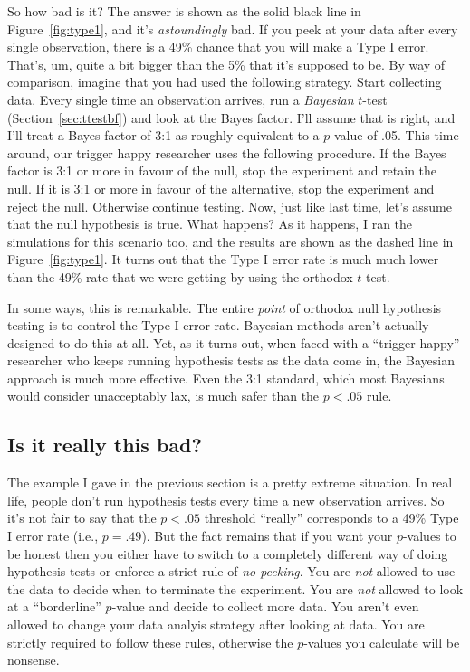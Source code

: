 So how bad is it? The answer is shown as the solid black line in Figure~\ref{fig:type1}, and it's {\it astoundingly} bad. If you peek at your data after every single observation, there is a 49\% chance that you will make a Type I error. That's, um, quite a bit bigger than the 5\% that it's supposed to be. By way of comparison, imagine that you had used the following strategy. Start collecting data. Every single time an observation arrives, run a {\it Bayesian} $t$-test (Section~\ref{sec:ttestbf}) and look at the Bayes factor. I'll assume that \textcite{Johnson2013} is right, and I'll treat a Bayes factor of 3:1 as roughly equivalent to a $p$-value of .05. This time around, our trigger happy researcher uses the following procedure. If the Bayes factor is 3:1 or more in favour of the null, stop the experiment and retain the null. If it is 3:1 or more in favour of the alternative, stop the experiment and reject the null. Otherwise continue testing. Now, just like last time, let's assume that the null hypothesis is true. What happens? As it happens, I ran the simulations for this scenario too, and the results are shown as the dashed line in Figure~\ref{fig:type1}. It turns out that the Type I error rate is much much lower than the 49\% rate that we were getting by using the orthodox $t$-test.

In some ways, this is remarkable. The entire {\it point} of orthodox null hypothesis testing is to control the Type I error rate. Bayesian methods aren't actually designed to do this at all. Yet, as it turns out, when faced with a ``trigger happy'' researcher who keeps running hypothesis tests as the data come in, the Bayesian approach is much more effective. Even the 3:1 standard, which most Bayesians would consider unacceptably lax, is much safer than the $p<.05$ rule. 

\subsection{Is it really this bad?}

The example I gave in the previous section is a pretty extreme situation. In real life, people don't run hypothesis tests every time a new observation arrives. So it's not fair to say that the $p<.05$ threshold ``really'' corresponds to a 49\% Type I error rate (i.e., $p=.49$). But the fact remains that if you want your $p$-values to be honest then you either have to switch to a completely different way of doing hypothesis tests or enforce a strict rule of {\it no peeking}. You are {\it not} allowed to use the data to decide when to terminate the experiment. You are {\it not} allowed to look at a ``borderline'' $p$-value and decide to collect more data. You aren't even allowed to change your data analyis strategy after looking at data. You are strictly required to follow these rules, otherwise the $p$-values you calculate will be nonsense.

